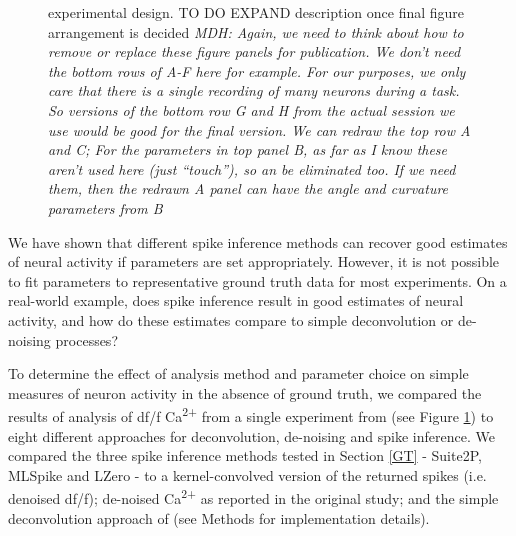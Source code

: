 \documentclass[a4paper,10pt,twocolumn]{article}
\begin{document}
\begin{figure}[h!]
\caption{\label{fig:peron_setup} \citep{Peron2015-qz} experimental design. TO DO EXPAND description once final figure arrangement is decided 
\emph{MDH: Again, we need to think about how to remove or replace these figure panels for publication.
We don’t need  the bottom rows of A-F here for example. For our purposes, we only care that there is a single recording of many neurons during a task.
So versions of the bottom row G and H from the actual session we use would be good for the final version.
We can redraw the top row A and C; 
For the parameters in top panel B, as far as I know these aren’t used here (just “touch”), so an be eliminated too. If we need them, then the redrawn A panel can have the angle and curvature parameters from B}}
\end{figure}

We have shown that different spike inference methods can recover good estimates of neural activity if parameters are set appropriately. However, it is not possible to fit parameters to representative ground truth data for most experiments. On a real-world example, does spike inference result in good estimates of neural activity, and how do these estimates compare to simple deconvolution or de-noising processes? 

To determine the effect of analysis method and parameter choice on simple measures of neuron activity in the absence of ground truth, we compared the results of analysis of df/f Ca\textsuperscript{2+}  from a single experiment from \citealt{Peron2015-qz} (see Figure \ref{fig:peron_setup}) to eight different approaches for deconvolution, de-noising and spike inference. We compared the three spike inference methods tested in Section \ref{GT} - Suite2P, MLSpike and LZero - to a kernel-convolved version of the returned spikes (i.e. denoised df/f); de-noised Ca\textsuperscript{2+} as reported in the original \citet{Peron2015-qz} study; and the simple deconvolution approach of \citet{Yaksi2006-ic} (see Methods for implementation details).

\end{document}
